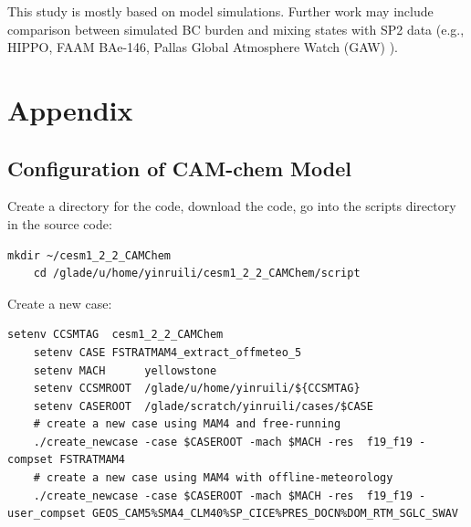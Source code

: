 \documentclass[12pt, fullpage]{uiucthesis2009}
\begin{document}
		This study is mostly based on model simulations. Further work may include comparison between simulated BC burden and mixing states with SP2 data (e.g., HIPPO, FAAM BAe-146, Pallas Global Atmosphere Watch (GAW) ).

	
	
	\chapter{Appendix}
	
	\section{Configuration of CAM-chem Model}
	Create a directory for the code, download the code, go into the scripts directory in the source code:
	\begin{lstlisting}[xleftmargin=0.01\textwidth, xrightmargin=0.01\textwidth]
	mkdir ~/cesm1_2_2_CAMChem
	cd /glade/u/home/yinruili/cesm1_2_2_CAMChem/script
	\end{lstlisting}
	
	Create a new case:
	\begin{lstlisting}[xleftmargin=0.01\textwidth, xrightmargin=0.01\textwidth]
	setenv CCSMTAG	cesm1_2_2_CAMChem
	setenv CASE	FSTRATMAM4_extract_offmeteo_5
	setenv MACH      yellowstone
	setenv CCSMROOT  /glade/u/home/yinruili/${CCSMTAG}
	setenv CASEROOT  /glade/scratch/yinruili/cases/$CASE
	# create a new case using MAM4 and free-running
	./create_newcase -case $CASEROOT -mach $MACH -res  f19_f19 -compset FSTRATMAM4
	# create a new case using MAM4 with offline-meteorology
	./create_newcase -case $CASEROOT -mach $MACH -res  f19_f19 -user_compset GEOS_CAM5%SMA4_CLM40%SP_CICE%PRES_DOCN%DOM_RTM_SGLC_SWAV 
	\end{lstlisting}
	
\end{document}
